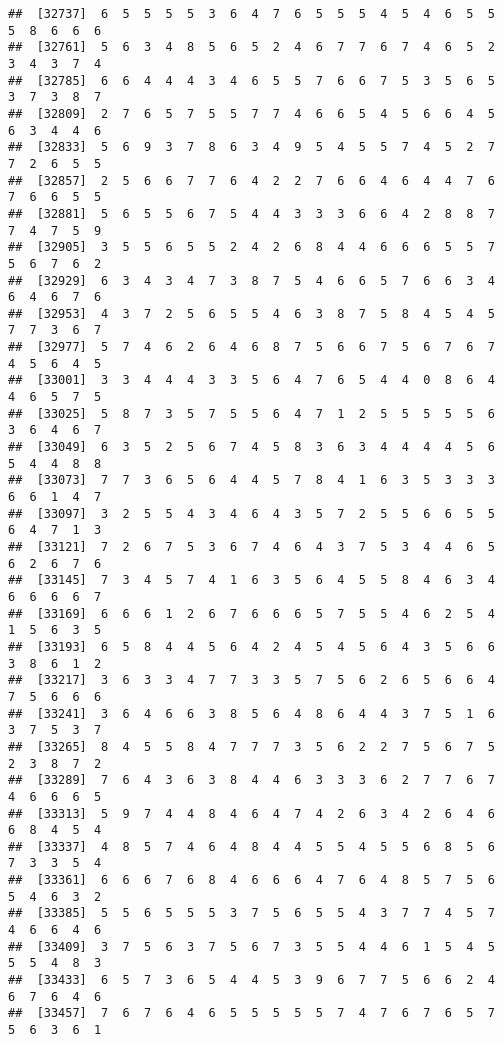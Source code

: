 \documentclass[
]{book}
\begin{document}
\begin{verbatim}
##  [32737]  6  5  5  5  5  3  6  4  7  6  5  5  5  4  5  4  6  5  5  5  8  6  6  6
##  [32761]  5  6  3  4  8  5  6  5  2  4  6  7  7  6  7  4  6  5  2  3  4  3  7  4
##  [32785]  6  6  4  4  4  3  4  6  5  5  7  6  6  7  5  3  5  6  5  3  7  3  8  7
##  [32809]  2  7  6  5  7  5  5  7  7  4  6  6  5  4  5  6  6  4  5  6  3  4  4  6
##  [32833]  5  6  9  3  7  8  6  3  4  9  5  4  5  5  7  4  5  2  7  7  2  6  5  5
##  [32857]  2  5  6  6  7  7  6  4  2  2  7  6  6  4  6  4  4  7  6  7  6  6  5  5
##  [32881]  5  6  5  5  6  7  5  4  4  3  3  3  6  6  4  2  8  8  7  7  4  7  5  9
##  [32905]  3  5  5  6  5  5  2  4  2  6  8  4  4  6  6  6  5  5  7  5  6  7  6  2
##  [32929]  6  3  4  3  4  7  3  8  7  5  4  6  6  5  7  6  6  3  4  6  4  6  7  6
##  [32953]  4  3  7  2  5  6  5  5  4  6  3  8  7  5  8  4  5  4  5  7  7  3  6  7
##  [32977]  5  7  4  6  2  6  4  6  8  7  5  6  6  7  5  6  7  6  7  4  5  6  4  5
##  [33001]  3  3  4  4  4  3  3  5  6  4  7  6  5  4  4  0  8  6  4  4  6  5  7  5
##  [33025]  5  8  7  3  5  7  5  5  6  4  7  1  2  5  5  5  5  5  6  3  6  4  6  7
##  [33049]  6  3  5  2  5  6  7  4  5  8  3  6  3  4  4  4  4  5  6  5  4  4  8  8
##  [33073]  7  7  3  6  5  6  4  4  5  7  8  4  1  6  3  5  3  3  3  6  6  1  4  7
##  [33097]  3  2  5  5  4  3  4  6  4  3  5  7  2  5  5  6  6  5  5  6  4  7  1  3
##  [33121]  7  2  6  7  5  3  6  7  4  6  4  3  7  5  3  4  4  6  5  6  2  6  7  6
##  [33145]  7  3  4  5  7  4  1  6  3  5  6  4  5  5  8  4  6  3  4  6  6  6  6  7
##  [33169]  6  6  6  1  2  6  7  6  6  6  5  7  5  5  4  6  2  5  4  1  5  6  3  5
##  [33193]  6  5  8  4  4  5  6  4  2  4  5  4  5  6  4  3  5  6  6  3  8  6  1  2
##  [33217]  3  6  3  3  4  7  7  3  3  5  7  5  6  2  6  5  6  6  4  7  5  6  6  6
##  [33241]  3  6  4  6  6  3  8  5  6  4  8  6  4  4  3  7  5  1  6  3  7  5  3  7
##  [33265]  8  4  5  5  8  4  7  7  7  3  5  6  2  2  7  5  6  7  5  2  3  8  7  2
##  [33289]  7  6  4  3  6  3  8  4  4  6  3  3  3  6  2  7  7  6  7  4  6  6  6  5
##  [33313]  5  9  7  4  4  8  4  6  4  7  4  2  6  3  4  2  6  4  6  6  8  4  5  4
##  [33337]  4  8  5  7  4  6  4  8  4  4  5  5  4  5  5  6  8  5  6  7  3  3  5  4
##  [33361]  6  6  6  7  6  8  4  6  6  6  4  7  6  4  8  5  7  5  6  5  4  6  3  2
##  [33385]  5  5  6  5  5  5  3  7  5  6  5  5  4  3  7  7  4  5  7  4  6  6  4  6
##  [33409]  3  7  5  6  3  7  5  6  7  3  5  5  4  4  6  1  5  4  5  5  5  4  8  3
##  [33433]  6  5  7  3  6  5  4  4  5  3  9  6  7  7  5  6  6  2  4  6  7  6  4  6
##  [33457]  7  6  7  6  4  6  5  5  5  5  5  7  4  7  6  7  6  5  7  5  6  3  6  1

\end{verbatim}
\end{document}
